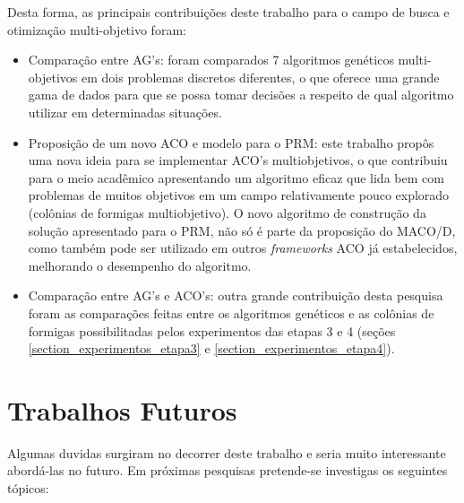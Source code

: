 Desta forma, as principais contribuições deste trabalho para o campo de busca e otimização multi-objetivo foram:

\begin{itemize}
	\item Comparação entre AG's: foram comparados 7 algoritmos genéticos multi-objetivos em dois problemas discretos diferentes, o que oferece uma grande gama de dados para que se possa tomar decisões a respeito de qual algoritmo utilizar em determinadas situações.
	\item Proposição de um novo ACO e modelo para o PRM: este trabalho propôs uma nova ideia para se implementar ACO's multiobjetivos, o que contribuiu para o meio acadêmico apresentando um algoritmo eficaz que lida bem com problemas de muitos objetivos em um campo relativamente pouco explorado (colônias de formigas multiobjetivo). O novo algoritmo de construção da solução apresentado para o PRM, não só é parte da proposição do MACO/D, como também pode ser utilizado em outros \textit{frameworks} ACO já estabelecidos, melhorando o desempenho do algoritmo.
	\item Comparação entre AG's e ACO's: outra grande contribuição desta pesquisa foram as comparações feitas entre os algoritmos genéticos e as colônias de formigas possibilitadas pelos experimentos das etapas 3 e 4 (seções \ref{section_experimentos_etapa3} e \ref{section_experimentos_etapa4}).
\end{itemize}

\section{Trabalhos Futuros}
Algumas duvidas surgiram no decorrer deste trabalho e seria muito interessante abordá-las no futuro. Em próximas pesquisas pretende-se investigas os seguintes tópicos:

